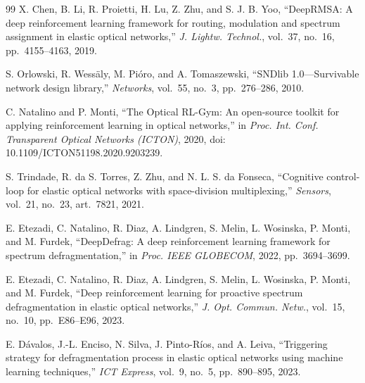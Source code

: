 \documentclass[preprint,12pt]{elsarticle}
\begin{document}
\begin{thebibliography}{99}
X. Chen, B. Li, R. Proietti, H. Lu, Z. Zhu, and S. J. B. Yoo, ``DeepRMSA: A deep reinforcement learning framework for routing, modulation and spectrum assignment in elastic optical networks,'' \textit{J. Lightw. Technol.}, vol.~37, no.~16, pp.~4155--4163, 2019.

S. Orlowski, R. Wess\"aly, M. Pi\'oro, and A. Tomaszewski, ``SNDlib 1.0---Survivable network design library,'' \textit{Networks}, vol.~55, no.~3, pp.~276--286, 2010.

C. Natalino and P. Monti, ``The Optical RL-Gym: An open-source toolkit for applying reinforcement learning in optical networks,'' in \textit{Proc. Int. Conf. Transparent Optical Networks (ICTON)}, 2020, doi: 10.1109/ICTON51198.2020.9203239.

S. Trindade, R. da S. Torres, Z. Zhu, and N. L. S. da Fonseca, ``Cognitive control-loop for elastic optical networks with space-division multiplexing,'' \textit{Sensors}, vol.~21, no.~23, art.~7821, 2021.

E. Etezadi, C. Natalino, R. Diaz, A. Lindgren, S. Melin, L. Wosinska, P. Monti, and M. Furdek, ``DeepDefrag: A deep reinforcement learning framework for spectrum defragmentation,'' in \textit{Proc. IEEE GLOBECOM}, 2022, pp.~3694--3699.

E. Etezadi, C. Natalino, R. Diaz, A. Lindgren, S. Melin, L. Wosinska, P. Monti, and M. Furdek, ``Deep reinforcement learning for proactive spectrum defragmentation in elastic optical networks,'' \textit{J. Opt. Commun. Netw.}, vol.~15, no.~10, pp.~E86--E96, 2023.

E. D\'avalos, J.-L. Enciso, N. Silva, J. Pinto-R\'ios, and A. Leiva, ``Triggering strategy for defragmentation process in elastic optical networks using machine learning techniques,'' \textit{ICT Express}, vol.~9, no.~5, pp.~890--895, 2023.

\end{thebibliography}
\end{document}

